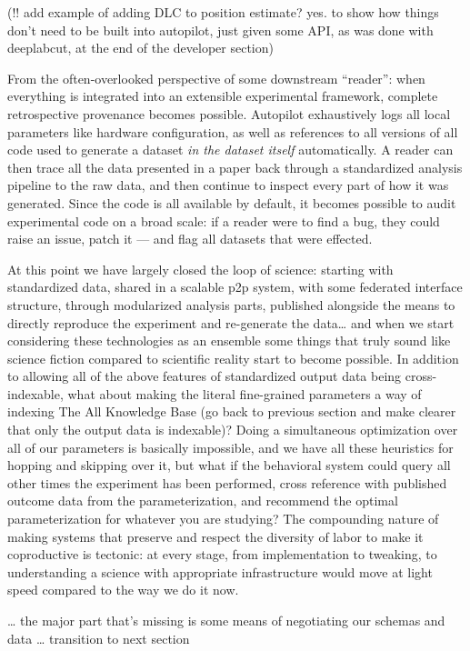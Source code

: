 \documentclass[10pt]{article}
\begin{document}
\begin{multicols}{2}
(!! add example of adding DLC to position estimate? yes. to show how
things don't need to be built into autopilot, just given some API, as
was done with deeplabcut, at the end of the developer section)

From the often-overlooked perspective of some downstream ``reader'':
when everything is integrated into an extensible experimental framework,
complete retrospective provenance becomes possible. Autopilot
exhaustively logs all local parameters like hardware configuration, as
well as references to all versions of all code used to generate a
dataset \emph{in the dataset itself} automatically. A reader can then
trace all the data presented in a paper back through a standardized
analysis pipeline to the raw data, and then continue to inspect every
part of how it was generated. Since the code is all available by
default, it becomes possible to audit experimental code on a broad
scale: if a reader were to find a bug, they could raise an issue, patch
it --- and flag all datasets that were effected.

At this point we have largely closed the loop of science: starting with
standardized data, shared in a scalable p2p system, with some federated
interface structure, through modularized analysis parts, published
alongside the means to directly reproduce the experiment and re-generate
the data\ldots{} and when we start considering these technologies as an
ensemble some things that truly sound like science fiction compared to
scientific reality start to become possible. In addition to allowing all
of the above features of standardized output data being cross-indexable,
what about making the literal fine-grained parameters a way of indexing
The All Knowledge Base (go back to previous section and make clearer
that only the output data is indexable)? Doing a simultaneous
optimization over all of our parameters is basically impossible, and we
have all these heuristics for hopping and skipping over it, but what if
the behavioral system could query all other times the experiment has
been performed, cross reference with published outcome data from the
parameterization, and recommend the optimal parameterization for
whatever you are studying? The compounding nature of making systems that
preserve and respect the diversity of labor to make it coproductive is
tectonic: at every stage, from implementation to tweaking, to
understanding a science with appropriate infrastructure would move at
light speed compared to the way we do it now.

\ldots{} the major part that's missing is some means of negotiating our
schemas and data \ldots{} transition to next section


\end{multicols}
\end{document}
